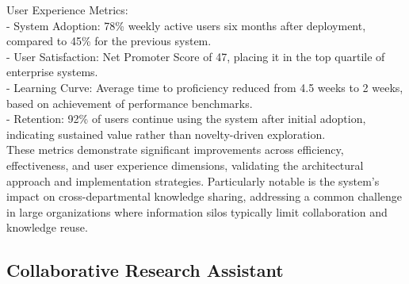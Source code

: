 User Experience Metrics:\\ \newline
- System Adoption: 78\% weekly active users six months after deployment, compared to 45\% for the previous system.\\ \newline
- User Satisfaction: Net Promoter Score of 47, placing it in the top quartile of enterprise systems.\\ \newline
- Learning Curve: Average time to proficiency reduced from 4.5 weeks to 2 weeks, based on achievement of performance benchmarks.\\ \newline
- Retention: 92\% of users continue using the system after initial adoption, indicating sustained value rather than novelty-driven exploration.\\ \newline
These metrics demonstrate significant improvements across efficiency, effectiveness, and user experience dimensions, validating the architectural approach and implementation strategies. Particularly notable is the system's impact on cross-departmental knowledge sharing, addressing a common challenge in large organizations where information silos typically limit collaboration and knowledge reuse.\\
\subsection{Collaborative Research Assistant}
